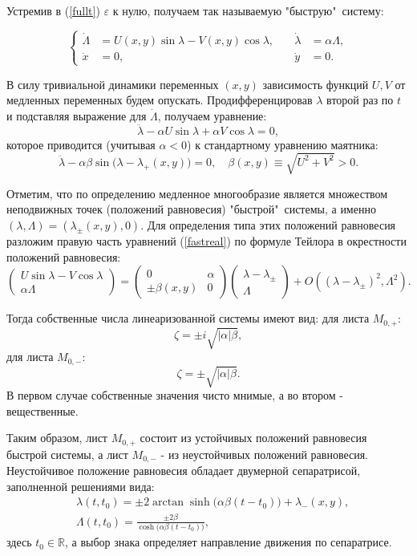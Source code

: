 Устремив в (\ref{fullt}) $\varepsilon$ к нулю, получаем так называемую "быструю"\, систему:

\begin{equation}
    \left\{
    \begin{aligned}
        \dot \Lambda &= U(x,y) \sin \lambda - V(x,y) \cos \lambda,
        &\quad
        \dot \lambda &= \alpha \Lambda, \\[1.5ex]
        \dot x &= 0,
        &\quad
        \dot y &= 0.
    \end{aligned}
    \right.
    \label{fastreal}
\end{equation}

В силу тривиальной динамики переменных $(x, y)$ зависимость функций $U, V$ от медленных переменных будем опускать. Продифференцировав $\lambda$ второй раз по $t$ и подставляя выражение для $\dot \Lambda$, получаем уравнение:
$$\ddot \lambda - \alpha U \sin \lambda + \alpha V \cos \lambda = 0,$$
которое приводится (учитывая $\alpha < 0$) к стандартному уравнению маятника:
$$\ddot \lambda - \alpha \beta \sin \big( \lambda - \lambda_{+}(x,y) \big) = 0, \quad \beta(x,y) \equiv \sqrt{U^2+V^2} > 0.$$

Отметим, что по определению медленное многообразие является множеством неподвижных точек (положений равновесия) "быстрой"\, системы, а именно 
$(\lambda, \Lambda)  = (\lambda_{\pm}(x,y), 0)$. Для определения типа этих положений равновесия разложим правую часть уравнений (\ref{fastreal}) по формуле Тейлора в окрестности положений равновесия:
$$\begin{pmatrix}
  U \sin \lambda - V \cos \lambda \\
  \alpha \Lambda
 \end{pmatrix}
 =
 \begin{pmatrix}
  0 & \alpha \\
  \pm \beta(x,y) & 0
 \end{pmatrix}
 \begin{pmatrix}
  \lambda - \lambda_{\pm}\\
  \Lambda
 \end{pmatrix} + O((\lambda - \lambda_{\pm})^2, \Lambda^2).
$$

Тогда собственные числа линеаризованной системы имеют вид:
\newline
для листа $M_{0,+}$:
$$\zeta = \pm i \sqrt{|\alpha| \beta},$$
\newline
для листа $M_{0,-}$:
$$\zeta = \pm \sqrt{|\alpha| \beta}.$$
В первом случае собственные значения чисто мнимые, а во втором - вещественные. 

Таким образом, лист $M_{0,+}$ состоит из устойчивых положений равновесия быстрой системы,  а лист $M_{0,-}$  - из неустойчивых положений равновесия. Неустойчивое положение равновесия обладает двумерной сепаратрисой, заполненной решениями вида:
\begin{align*}
&\lambda(t, t_0) = \pm 2 \arctan \sinh \big( \alpha \beta (t-t_0) \big) + \lambda_{-}(x,y),\\
&\Lambda(t, t_0) = \frac{\pm 2 \beta}{\cosh \big( \alpha \beta (t-t_0) \big)},
\end{align*}
здесь $t_{0}\in \mathbb{R}$, а выбор знака определяет направление движения по сепаратрисе.